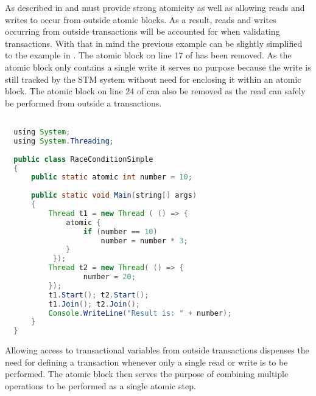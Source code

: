 As described in  and  \stmnamesp must provide strong atomicity as well as allowing reads and writes to occur from outside atomic blocks. As a result, reads and writes occurring from outside transactions will be accounted for when validating transactions. With that in mind the previous example can be slightly simplified to the example in . The atomic block on line 17 of  has been removed. As the atomic block only contains a single write it serves no purpose because the write is still tracked by the \ac{STM} system without need for enclosing it within an atomic block. The atomic block on line 24 of  can also be removed as the read can safely be performed from outside a transactions.

\begin{lstlisting}[label=lst:stm_atomic_syntax_simplified,
  caption={Transaction Syntax Simplified},
  language=Java,  
  showspaces=false,
  showtabs=false,
  breaklines=true,
  showstringspaces=false,
  breakatwhitespace=true,
  commentstyle=\color{greencomments},
  keywordstyle=\color{bluekeywords},
  stringstyle=\color{redstrings},
  morekeywords={atomic, retry, orElse, var, get, set, using}]  % Start your code-block

  using System;
  using System.Threading;
  
  public class RaceConditionSimple
  {
      public static atomic int number = 10;
  
      public static void Main(string[] args)
      {
          Thread t1 = new Thread ( () => {
              atomic {
                  if (number == 10)           
                      number = number * 3;
              }
           });
          Thread t2 = new Thread( () => {
                  number = 20;
          });
          t1.Start(); t2.Start();
          t1.Join(); t2.Join();
          Console.WriteLine("Result is: " + number);
      }
  }
\end{lstlisting}
Allowing access to transactional variables from outside transactions dispenses the need for defining a transaction whenever only a single read or write is to be performed. The atomic block then serves the purpose of combining multiple operations to be performed as a single atomic step.

